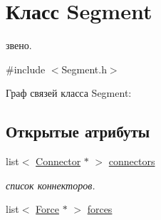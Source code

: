 \hypertarget{class_segment}{
\section{Класс Segment}
\label{class_segment}
}


звено.  




{\ttfamily \#include $<$Segment.h$>$}



Граф связей класса Segment:
\subsection*{Открытые атрибуты}
\begin{DoxyCompactItemize}
\item 
\hypertarget{class_segment_a75cbf2471c706e881fb87ff71247a2fa}{
list$<$ \hyperlink{struct_connector}{Connector} $\ast$ $>$ \hyperlink{class_segment_a75cbf2471c706e881fb87ff71247a2fa}{connectors}}
\label{class_segment_a75cbf2471c706e881fb87ff71247a2fa}

\begin{DoxyCompactList}\small\item\em список коннекторов. \item\end{DoxyCompactList}\item 
\hypertarget{class_segment_a5cf022f056558cef34766627bf4f1ecb}{
list$<$ \hyperlink{class_force}{Force} $\ast$ $>$ \hyperlink{class_segment_a5cf022f056558cef34766627bf4f1ecb}{forces}}
\label{class_segment_a5cf022f056558cef34766627bf4f1ecb}


\end{DoxyCompactItemize}
